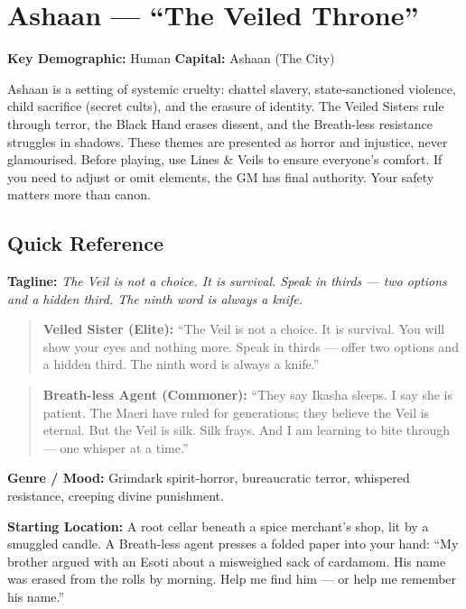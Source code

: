 \section{Ashaan --- ``The Veiled Throne''}
\label{chap:ashaan}

\textbf{Key Demographic: } Human
\textbf{Capital: } Ashaan (The City)

\begin{tcolorbox}[colback=red!5!white,colframe=red!60!black,title={Content Warning},breakable]
Ashaan is a setting of systemic cruelty: chattel slavery, state-sanctioned violence, child sacrifice (secret cults), and the erasure of identity. The Veiled Sisters rule through terror, the Black Hand erases dissent, and the Breath-less resistance struggles in shadows. These themes are presented as horror and injustice, never glamourised. Before playing, use Lines \& Veils to ensure everyone's comfort. If you need to adjust or omit elements, the GM has final authority. Your safety matters more than canon.
\end{tcolorbox}

\subsection*{Quick Reference}
\textbf{Tagline:} \textit{The Veil is not a choice. It is survival. Speak in thirds --- two options and a hidden third. The ninth word is always a knife.}

\begin{quote}
  \textbf{Veiled Sister (Elite):}  
  ``The Veil is not a choice. It is survival. You will show your eyes and nothing more. Speak in thirds --- offer two options and a hidden third. The ninth word is always a knife.''
\end{quote}

\begin{quote}
  \textbf{Breath-less Agent (Commoner):}  
  ``They say Ikasha sleeps. I say she is patient. The Maeri have ruled for generations; they believe the Veil is eternal. But the Veil is silk. Silk frays. And I am learning to bite through --- one whisper at a time.''
\end{quote}

\noindent\textbf{Genre / Mood:} Grimdark spirit-horror, bureaucratic terror, whispered resistance, creeping divine punishment.

\noindent\textbf{Starting Location:} A root cellar beneath a spice merchant's shop, lit by a smuggled candle. A Breath-less agent presses a folded paper into your hand: ``My brother argued with an Esoti about a misweighed sack of cardamom. His name was erased from the rolls by morning. Help me find him --- or help me remember his name.''

